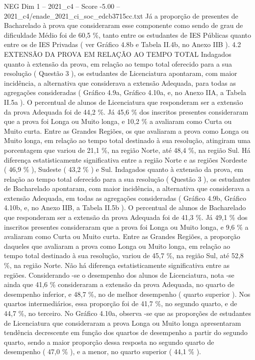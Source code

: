 \begin{textsample}{NEG Dim 1 – 2021\_c4 – Score -5.00 – 2021\_c4/enade\_2021\_ci\_soc\_edcb3715cc.txt}
Já a proporção de presentes de Bacharelado à prova que consideraram esse componente como sendo de grau de dificuldade Médio foi de 60,5 \%, tanto entre os estudantes de IES Públicas quanto entre os de IES Privadas ( ver Gráfico 4.8b e Tabela II.4b, no Anexo IIB ). 4.2 EXTENSÃO DA PROVA EM RELAÇÃO AO TEMPO TOTAL Indagados quanto à extensão da prova, em relação ao tempo total oferecido para a sua resolução ( Questão 3 ), os estudantes de Licenciatura apontaram, com maior incidência, a alternativa que considerava a extensão Adequada, para todas as agregações consideradas ( Gráfico 4.9a, Gráfico 4.10a, e, no Anexo IIA, a Tabela II.5a ).
O percentual de alunos de Licenciatura que responderam ser a extensão da prova Adequada foi de 44,2 \%.
Já 45,6 \% dos inscritos presentes consideraram que a prova foi Longa ou Muito longa, e 10,2 \% a avaliaram como Curta ou Muito curta.
Entre as Grandes Regiões, os que avaliaram a prova como Longa ou Muito longa, em relação ao tempo total destinado à sua resolução, atingiram uma porcentagem que variou de 21,1 \%, na região Norte, até 48,4 \%, na região Sul.
Há diferença estatisticamente significativa entre a região Norte e as regiões Nordeste ( 46,9 \% ), Sudeste ( 43,2 \% ) e Sul.
Indagados quanto à extensão da prova, em relação ao tempo total oferecido para a sua resolução ( Questão 3 ), os estudantes de Bacharelado apontaram, com maior incidência, a alternativa que considerava a extensão Adequada, em todas as agregações consideradas ( Gráfico 4.9b, Gráfico 4.10b, e, no Anexo IIB, a Tabela II.5b ).
O percentual de alunos de Bacharelado que responderam ser a extensão da prova Adequada foi de 41,3 \%.
Já 49,1 \% dos inscritos presentes consideraram que a prova foi Longa ou Muito longa, e 9,6 \% a avaliaram como Curta ou Muito curta.
Entre as Grandes Regiões, a proporção daqueles que avaliaram a prova como Longa ou Muito longa, em relação ao tempo total destinado à sua resolução, variou de 45,7 \%, na região Sul, até 52,8 \%, na região Norte.
Não há diferença estatisticamente significativa entre as regiões.
Considerando -se o desempenho dos alunos de Licenciatura, nota -se ainda que 41,6 \% consideraram a extensão da prova Adequada, no quarto de desempenho inferior, e 48,7 \%, no de melhor desempenho ( quarto superior ).
Nos quartos intermediários, essa proporção foi de 41,7 \%, no segundo quarto, e de 44,7 \%, no terceiro.
No Gráfico 4.10a, observa -se que as proporções de estudantes de Licenciatura que consideraram a prova Longa ou Muito longa apresentaram tendência decrescente em função dos quartos de desempenho a partir do segundo quarto, sendo a maior proporção dessa resposta no segundo quarto de desempenho ( 47,0 \% ), e a menor, no quarto superior ( 44,1 \% ).

\end{textsample}
